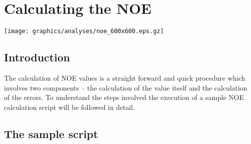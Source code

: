 
\chapter{Calculating the NOE}


\begin{figure*}[h]
\texttt{[image: graphics/analyses/noe\_600x600.eps.gz]}
\end{figure*}



\section{Introduction}

The calculation of NOE values is a straight forward and quick procedure which involves two components -- the calculation of the value itself and the calculation of the errors.  To understand the steps involved the execution of a sample NOE calculation script will be followed in detail.




\section{The sample script}

